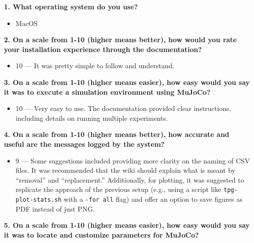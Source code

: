 \documentclass[12pt, titlepage]{article}
\begin{document}
\textbf{1. What operating system do you use?}

\begin{itemize}
    \item MacOS
\end{itemize}

\vspace{1em}

\textbf{2. On a scale from 1-10 (higher means better), how would you rate your installation experience through the documentation?}

\begin{itemize}
    \item 10 --- It was pretty simple to follow and understand.
\end{itemize}

\vspace{1em}

\textbf{3. On a scale from 1-10 (higher means easier), how easy would you say it was to execute a simulation environment using MuJoCo?}

\begin{itemize}
    \item 10 --- Very easy to use. The documentation provided clear instructions,
          including details on running multiple experiments.
\end{itemize}

\vspace{1em}

\textbf{4. On a scale from 1-10 (higher means better), how accurate and useful are the messages logged by the system?}

\begin{itemize}
    \item 9 --- Some suggestions included providing more clarity on the naming of CSV files.
          It was recommended that the wiki should explain what is meant by ``removal'' and
          ``replacement.'' Additionally, for plotting, it was suggested to replicate the
          approach of the previous setup (e.g., using a script like \texttt{tpg-plot-stats.sh}
          with a \texttt{-for all} flag) and offer an option to save figures as PDF instead of
          just PNG.
\end{itemize}

\vspace{1em}

\textbf{5. On a scale from 1-10 (higher means easier), how easy would you say it was to locate and customize parameters for MuJoCo?}
\end{document}
